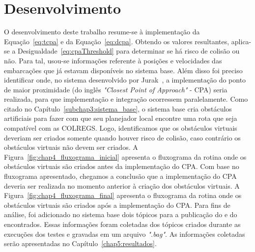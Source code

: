 \chapter{Desenvolvimento}\label{chap4:desenvolvimento}

    
    O desenvolvimento deste trabalho resume-se à implementação da Equação~\ref{eq:tcpa} e da Equação~\ref{eq:dcpa}. 
    Obtendo os valores resultantes, aplica-se a Desigualdade~\ref{eq:cpaThreshold} para determinar se há risco de colisão ou não. Para tal, usou-se informações referente à posições e velocidades das embarcações que já estavam disponíveis no sistema base. Além disso foi preciso identificar onde, no sistema desenvolvido por Jurak~\cite{Jurak2020COLREGS}, a implementação do ponto de maior proximidade (do inglês \textit{"Closest Point of Approach"} - CPA) seria realizada, para que implementação e integração ocorressem paralelamente. 
    Como citado no Capítulo~\ref{subchap3:sistema_base}, o sistema base cria obstáculos artificiais para fazer com que seu planejador local encontre uma rota que seja compatível com as COLREGS. 
    Logo, identificamos que os obstáculos virtuais deveriam ser criados somente quando houver risco de colisão, caso contrário os obstáculos virtuais não devem ser criados. 
    A Figura~\ref{fig:chap4_fluxograma_inicial} apresenta o fluxograma da rotina onde os obstáculos virtuais são criados antes da implementação do CPA. 
    Com base no fluxograma apresentado, chegamos a conclusão que a implementação do CPA deveria ser realizada no momento anterior à criação dos obstáculos virtuais. 
    A Figura~\ref{fig:chap4_fluxograma_final} apresenta o fluxograma da rotina onde os obstáculos virtuais são criados após a implementação do CPA. 
    Para fins de análise, foi adicionado no sistema base dois tópicos para a publicação do \tcpa e do \dcpa encontrados. Essas informações foram coletadas dos tópicos criados durante as execuções dos testes e gravadas em um arquivo \textit{".bag"}. As informações coletadas serão apresentadas no Capítulo~\ref{chap5:resultados}.
    
